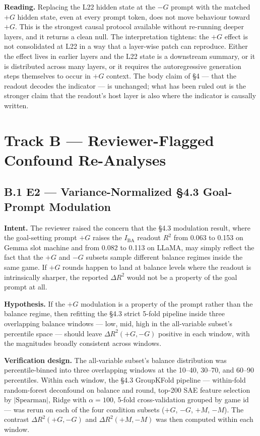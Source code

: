 \documentclass[11pt,a4paper]{article}
\begin{document}
\textbf{Reading.} Replacing the L22 hidden state at the $-G$ prompt with the matched $+G$ hidden state, even at every prompt token, does not move behaviour toward $+G$. This is the strongest causal protocol available without re-running deeper layers, and it returns a clean null. The interpretation tightens: the $+G$ effect is not consolidated at L22 in a way that a layer-wise patch can reproduce. Either the effect lives in earlier layers and the L22 state is a downstream summary, or it is distributed across many layers, or it requires the autoregressive generation steps themselves to occur in $+G$ context. The body claim of \S4 --- that the readout decodes the indicator --- is unchanged; what has been ruled out is the stronger claim that the readout's host layer is also where the indicator is causally written.

\section*{Track B --- Reviewer-Flagged Confound Re-Analyses}

\subsection*{B.1 E2 --- Variance-Normalized \S4.3 Goal-Prompt Modulation}

\textbf{Intent.} The reviewer raised the concern that the \S4.3 modulation result, where the goal-setting prompt $+G$ raises the $I_\text{BA}$ readout $R^2$ from 0.063 to 0.153 on Gemma slot machine and from 0.082 to 0.113 on LLaMA, may simply reflect the fact that the $+G$ and $-G$ subsets sample different balance regimes inside the same game. If $+G$ rounds happen to land at balance levels where the readout is intrinsically sharper, the reported $\Delta R^2$ would not be a property of the goal prompt at all.

\textbf{Hypothesis.} If the $+G$ modulation is a property of the prompt rather than the balance regime, then refitting the \S4.3 strict 5-fold pipeline inside three overlapping balance windows --- low, mid, high in the all-variable subset's percentile space --- should leave $\Delta R^2(+G, -G)$ positive in each window, with the magnitudes broadly consistent across windows.

\textbf{Verification design.} The all-variable subset's balance distribution was percentile-binned into three overlapping windows at the 10--40, 30--70, and 60--90 percentiles. Within each window, the \S4.3 GroupKFold pipeline --- within-fold random-forest deconfound on balance and round, top-200 SAE feature selection by $|\text{Spearman}|$, Ridge with $\alpha = 100$, 5-fold cross-validation grouped by game id --- was rerun on each of the four condition subsets ($+G$, $-G$, $+M$, $-M$). The contrast $\Delta R^2(+G, -G)$ and $\Delta R^2(+M, -M)$ was then computed within each window.
\end{document}
